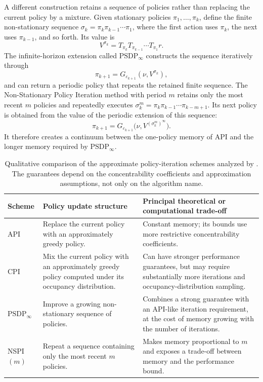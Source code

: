 A different construction retains a sequence of policies rather than replacing
the current policy by a mixture. Given stationary policies
$\pi_1,\ldots,\pi_k$, define the finite non-stationary sequence
$\sigma_k=\pi_k\pi_{k-1}\cdots\pi_1$, where the first action uses $\pi_k$, the
next uses $\pi_{k-1}$, and so forth. Its value is
\begin{equation}
    V^{\sigma_k}
    =T_{\pi_k}T_{\pi_{k-1}}\cdots T_{\pi_1}r.
    \label{eq:rl-psdp-value}
\end{equation}
The infinite-horizon extension called $\mathrm{PSDP}_\infty$ constructs the
sequence iteratively through
\begin{equation}
    \pi_{k+1}
    =G_{\varepsilon_{k+1}}(\nu,V^{\sigma_k}),
    \label{eq:rl-psdp}
\end{equation}
and can return a periodic policy that repeats the retained finite sequence.
The Non-Stationary Policy Iteration method with period $m$ retains only the
most recent $m$ policies and repeatedly executes
$\sigma_k^m=\pi_k\pi_{k-1}\cdots\pi_{k-m+1}$. Its next policy is obtained
from the value of the periodic extension of this sequence:
\begin{equation}
    \pi_{k+1}=G_{\varepsilon_{k+1}}
       \bigl(\nu,V^{(\sigma_k^m)^\infty}\bigr).
    \label{eq:rl-nspi}
\end{equation}
It therefore creates a continuum between the one-policy memory of API and
the longer memory required by $\mathrm{PSDP}_\infty$.

\begin{table}[htbp]
    \centering
    \caption{Qualitative comparison of the approximate policy-iteration schemes
    analyzed by \textcite{scherrer2014approximate}. The guarantees depend on the
    concentrability coefficients and approximation assumptions, not only on
    the algorithm name.}
    \label{tab:rl-approximate-policy-iteration}
    \begin{tabularx}{\textwidth}{lXX}
        \toprule
        Scheme & Policy update structure & Principal theoretical or computational trade-off \\
        \midrule
        API & Replace the current policy with an approximately greedy policy. & Constant memory; its bounds use more restrictive concentrability coefficients. \\
        CPI & Mix the current policy with an approximately greedy policy computed under its occupancy distribution. & Can have stronger performance guarantees, but may require substantially more iterations and occupancy-distribution sampling. \\
        $\mathrm{PSDP}_\infty$ & Improve a growing non-stationary sequence of policies. & Combines a strong guarantee with an API-like iteration requirement, at the cost of memory growing with the number of iterations. \\
        NSPI$(m)$ & Repeat a sequence containing only the most recent $m$ policies. & Makes memory proportional to $m$ and exposes a trade-off between memory and the performance bound. \\
        \bottomrule
    \end{tabularx}
\end{table}

